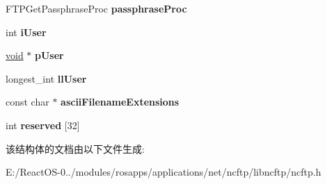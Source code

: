 \begin{DoxyCompactItemize}
F\+T\+P\+Get\+Passphrase\+Proc {\bfseries passphrase\+Proc}
\item 
\mbox{\label{struct_f_t_p_connection_info_a12b2fb94110db5a05576b2d1d4a32f11}} 
int {\bfseries i\+User}
\item 
\mbox{\label{struct_f_t_p_connection_info_a967b02ddfde084b4df5e4c1bbedf37c9}} 
\hyperlink{interfacevoid}{void} $\ast$ {\bfseries p\+User}
\item 
\mbox{\label{struct_f_t_p_connection_info_a89732c91c5e852569cc3f7506f41a5e3}} 
longest\+\_\+int {\bfseries ll\+User}
\item 
\mbox{\label{struct_f_t_p_connection_info_a89385e648f08e83366e11b0bb093a4f4}} 
const char $\ast$ {\bfseries ascii\+Filename\+Extensions}
\item 
\mbox{\label{struct_f_t_p_connection_info_a2f10390b80860685f3e212226dd2cf62}} 
int {\bfseries reserved} \mbox{[}32\mbox{]}
\end{DoxyCompactItemize}


该结构体的文档由以下文件生成\+:\begin{DoxyCompactItemize}
\item 
E\+:/\+React\+O\+S-\/0../modules/rosapps/applications/net/ncftp/libncftp/ncftp.\+h\end{DoxyCompactItemize}
